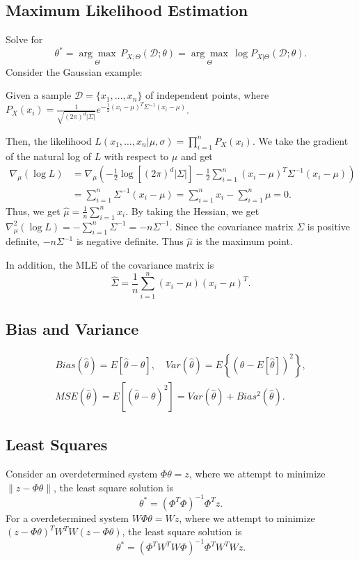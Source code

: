 \documentclass{article}
\newenvironment{topic}[1]{\subsection*{#1}}{}
\newcommand*{\D}{\mathcal{D}}
\begin{document}
\begin{topic}{Maximum Likelihood Estimation}
    Solve for
    \[
        \theta^* = \underset{\Theta}{\arg \max} \, P_{X;\Theta}(\D;\theta) = \underset{\Theta}{\arg \max} \, \log P_{X|\Theta}(\D;\theta).
    \]
    Consider the Gaussian example: 
    
    Given a sample $\D = \{x_1, \dots , x_n\}$ of independent points, where $P_X(x_i) = \frac{1}{\sqrt{(2\pi)^d|\Sigma|}}e^{-\frac{1}{2}(x_i - \mu)^T\Sigma^{-1}(x_i - \mu)}$.

    Then, the likelihood $L(x_1, \dots, x_n|\mu, \sigma) = \prod_{i = 1}^n P_X(x_i)$. We take the gradient of the natural log of $L$ with respect to $\mu$ and get
    \begin{align*}
        \nabla_{\mu} (\log L) 
        &= \nabla_{\mu} \left(-\frac{1}{2}\log[(2\pi)^d|\Sigma|] - \frac{1}{2} \sum_{i = 1}^n (x_i - \mu)^T\Sigma^{-1}(x_i - \mu)\right) \\
        &= \sum_{i = 1}^n \Sigma^{-1}(x_i - \mu) = \sum_{i = 1}^n x_i - \sum_{i = 1}^n \mu  = 0.
    \end{align*}
    Thus, we get $\hat{\mu} = \frac{1}{n}\sum_{i = 1}^n x_i$. By taking the Hessian, we get $\nabla_{\mu}^2(\log L) = -\sum_{i = 1}^n \Sigma^{-1} = -n\Sigma^{-1}$. Since the covariance matrix $\Sigma$ is positive definite, $-n\Sigma^{-1}$ is negative definite. Thus $\hat{\mu}$ is the maximum point.

    In addition, the MLE of the covariance matrix is
    \[
        \hat{\Sigma} = \frac{1}{n}\sum_{i = 1}^n (x_i - \mu)(x_i - \mu)^T.
    \]
\end{topic}

\begin{topic}{Bias and Variance}
    \begin{gather*}
        Bias(\hat{\theta}) = E[\hat{\theta} - \theta], \quad Var(\hat{\theta}) = E\left\{(\hat{\theta} - E[\hat{\theta}])^2\right\}, \\
        MSE(\hat{\theta}) = E\left[(\hat{\theta} - \theta)^2\right] = Var(\hat{\theta}) + Bias^2(\hat{\theta}).
    \end{gather*}
\end{topic}

\begin{topic}{Least Squares}
    Consider an overdetermined system $\Phi\theta = z$, where we attempt to minimize $\lVert z - \Phi\theta \rVert$, the least square solution is
    \[
        \theta^* = (\Phi^T\Phi)^{-1}\Phi^Tz.
    \]
    For a overdetermined system $W\Phi\theta = Wz$, where we attempt to minimize $(z - \Phi\theta)^TW^TW(z - \Phi\theta)$, the least square solution is
    \[
        \theta^* = (\Phi^TW^TW\Phi)^{-1}\Phi^TW^TWz.
    \]
\end{topic}
\end{document}
